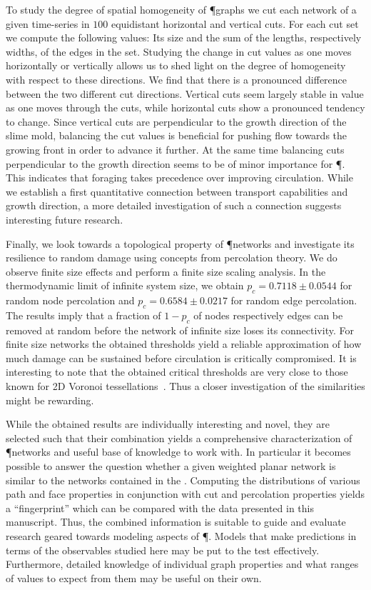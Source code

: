 		To study the degree of spatial homogeneity of \P graphs we cut each network of a given time-series in $100$ equidistant horizontal and vertical cuts. For each cut set we compute the following values: Its size and the sum of the lengths, respectively widths, of the edges in the set. Studying the change in cut values as one moves horizontally or vertically allows us to shed light on the degree of homogeneity with respect to these directions. We find that there is a pronounced difference between the two different cut directions. Vertical cuts seem largely stable in value as one moves through the cuts, while horizontal cuts show a pronounced tendency to change. Since vertical cuts are perpendicular to the growth direction of the slime mold, balancing the cut values is beneficial for pushing flow towards the growing front in order to advance it further. At the same time balancing cuts perpendicular to the growth direction seems to be of minor importance for \P. This indicates that foraging takes precedence over improving circulation. While we establish a first quantitative connection between transport capabilities and growth direction, a more detailed investigation of such a connection suggests interesting future research.

		Finally, we look towards a topological property of \P networks and investigate its resilience to random damage using concepts from percolation theory. We do observe finite size effects and perform a finite size scaling analysis. In the thermodynamic limit of infinite system size, we obtain $p_c = 0.7118 \pm 0.0544$ for random node percolation and $p_c = 0.6584 \pm 0.0217$ for random edge percolation. The results imply that a fraction of $1-p_c$ of nodes respectively edges can be removed at random before the network of infinite size loses its connectivity. For finite size networks the obtained thresholds yield a reliable approximation of how much damage can be sustained before circulation is critically compromised. It is interesting to note that the obtained critical thresholds are very close to those known for 2D Voronoi tessellations~\cite{becker2009percolation}. Thus a closer investigation of the similarities might be rewarding.

		While the obtained results are individually interesting and novel, they are selected such that their combination yields a comprehensive characterization of \P networks and useful base of knowledge to work with. In particular it becomes possible to answer the question whether a given weighted planar network is similar to the networks contained in the \data. Computing the distributions of various path and face properties in conjunction with cut and percolation properties yields a ``fingerprint'' which can be compared with the data presented in this manuscript. Thus, the combined information is suitable to guide and evaluate research geared towards modeling aspects of \P. Models that make predictions in terms of the observables studied here may be put to the test effectively. Furthermore, detailed knowledge of individual graph properties and what ranges of values to expect from them may be useful on their own.

